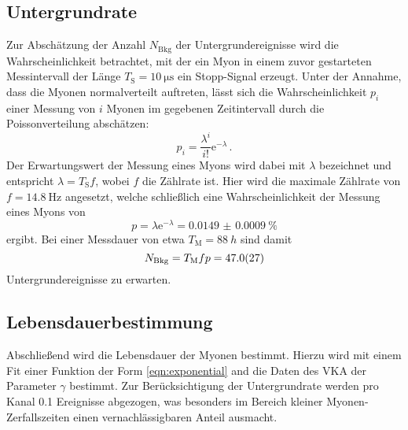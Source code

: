 \clearpage
\subsection{Untergrundrate}
\label{subsec:untergrund}
Zur Abschätzung der Anzahl $N_\text{Bkg}$ der Untergrundereignisse wird
die Wahrscheinlichkeit betrachtet,
mit der ein Myon in einem zuvor gestarteten Messintervall der Länge
$T_\text{S} = \SI{10}{\micro \second}$ ein Stopp-Signal erzeugt.
Unter der Annahme, dass die Myonen normalverteilt auftreten,
lässt sich die Wahrscheinlichkeit $p_i$ einer Messung von $i$ Myonen im
gegebenen Zeitintervall durch die Poissonverteilung abschätzen:
\begin{equation*}
    p_i = \frac{\lambda^i}{i!}\mathrm{e}^{-\lambda}\,.
\end{equation*}
Der Erwartungswert der Messung eines Myons wird dabei mit $\lambda$
bezeichnet und entspricht $\lambda = T_\text{S}f$, wobei $f$ die Zählrate ist.
Hier wird die maximale Zählrate von $f = \SI{14.8}{\hertz}$ angesetzt,
welche schließlich eine Wahrscheinlichkeit der Messung eines Myons von
\begin{equation*}
    p = \lambda \mathrm{e}^{-\lambda} = \SI{0.0149(9)}{\percent}
\end{equation*}
ergibt.
Bei einer Messdauer von etwa $T_\text{M} = \SI{88}{h}$ sind damit
\begin{equation*}
    N_\text{Bkg} = T_\text{M}fp = \num{47.0+-2.7}
\end{equation*}
Untergrundereignisse zu erwarten.

\subsection{Lebensdauerbestimmung}
\label{subsec:lebensdauer}
Abschließend wird die Lebensdauer der Myonen bestimmt.
Hierzu wird mit einem Fit einer Funktion der Form \eqref{eqn:exponential}
and die Daten des VKA der Parameter $\gamma$ bestimmt.
Zur Berücksichtigung der Untergrundrate werden pro Kanal \num{0.1} Ereignisse
abgezogen, was besonders im Bereich kleiner Myonen-Zerfallszeiten einen
vernachlässigbaren Anteil ausmacht.

